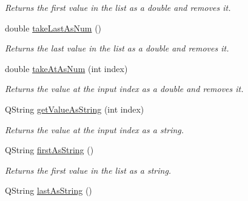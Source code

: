 \begin{DoxyCompactItemize}
\begin{DoxyCompactList}\small\item\em Returns the first value in the list as a double and removes it. \end{DoxyCompactList}\item 
\hypertarget{class_picto_1_1_analysis_variable_list_a37c745b594e0acd5ffb177c944a1cce9}{double \hyperlink{class_picto_1_1_analysis_variable_list_a37c745b594e0acd5ffb177c944a1cce9}{take\-Last\-As\-Num} ()}\label{class_picto_1_1_analysis_variable_list_a37c745b594e0acd5ffb177c944a1cce9}

\begin{DoxyCompactList}\small\item\em Returns the last value in the list as a double and removes it. \end{DoxyCompactList}\item 
\hypertarget{class_picto_1_1_analysis_variable_list_a2a8befa68141d5aaa100f1f067b9bbab}{double \hyperlink{class_picto_1_1_analysis_variable_list_a2a8befa68141d5aaa100f1f067b9bbab}{take\-At\-As\-Num} (int index)}\label{class_picto_1_1_analysis_variable_list_a2a8befa68141d5aaa100f1f067b9bbab}

\begin{DoxyCompactList}\small\item\em Returns the value at the input index as a double and removes it. \end{DoxyCompactList}\item 
\hypertarget{class_picto_1_1_analysis_variable_list_aecf043a17d2764552e9783347aa1bde7}{Q\-String \hyperlink{class_picto_1_1_analysis_variable_list_aecf043a17d2764552e9783347aa1bde7}{get\-Value\-As\-String} (int index)}\label{class_picto_1_1_analysis_variable_list_aecf043a17d2764552e9783347aa1bde7}

\begin{DoxyCompactList}\small\item\em Returns the value at the input index as a string. \end{DoxyCompactList}\item 
\hypertarget{class_picto_1_1_analysis_variable_list_ae7ff3eeb0e8932c16c39b64a556d6c2f}{Q\-String \hyperlink{class_picto_1_1_analysis_variable_list_ae7ff3eeb0e8932c16c39b64a556d6c2f}{first\-As\-String} ()}\label{class_picto_1_1_analysis_variable_list_ae7ff3eeb0e8932c16c39b64a556d6c2f}

\begin{DoxyCompactList}\small\item\em Returns the first value in the list as a string. \end{DoxyCompactList}\item 
\hypertarget{class_picto_1_1_analysis_variable_list_a1e13597818e378e3ba8a72dd1d5f0862}{Q\-String \hyperlink{class_picto_1_1_analysis_variable_list_a1e13597818e378e3ba8a72dd1d5f0862}{last\-As\-String} ()}\label{class_picto_1_1_analysis_variable_list_a1e13597818e378e3ba8a72dd1d5f0862}


\end{DoxyCompactItemize}
